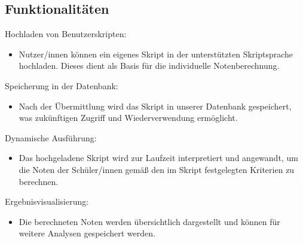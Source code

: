 \newpage
\subsection*{Funktionalitäten}

Hochladen von Benutzerskripten:
\begin{itemize}
    \item Nutzer/innen können ein eigenes Skript in der unterstützten Skriptsprache hochladen. 
    Dieses dient als Basis für die individuelle Notenberechnung.
\end{itemize}

Speicherung in der Datenbank:
\begin{itemize}
    \item Nach der Übermittlung wird das Skript in unserer Datenbank gespeichert, was zukünftigen 
    Zugriff und Wiederverwendung ermöglicht.
\end{itemize} 

Dynamische Ausführung: 
\begin{itemize}
    \item Das hochgeladene Skript wird zur Laufzeit interpretiert und angewandt, 
    um die Noten der Schüler/innen gemäß den im Skript festgelegten Kriterien zu berechnen.
\end{itemize}

Ergebnisvisualisierung: 
\begin{itemize}
    \item Die berechneten Noten werden übersichtlich dargestellt und können 
    für weitere Analysen gespeichert werden.
\end{itemize}

